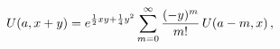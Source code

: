 \[\mathop{U\/}\nolimits\!\left(a,x+y\right)=e^{\frac{1}{2}xy+\frac{1}{4}y^{2}}%
\sum_{m=0}^{\infty}\frac{(-y)^{m}}{m!}\mathop{U\/}\nolimits\!\left(a-m,x\right),\]